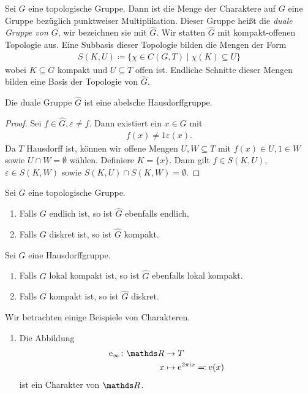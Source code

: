 \begin{defi}
Sei $G$ eine topologische Gruppe. Dann ist die Menge der Charaktere auf $G$ eine Gruppe bezüglich punktweiser Multiplikation.
Dieser Gruppe heißt die \emph{duale Gruppe von $G$}, wir bezeichnen sie mit $\hat{G}$.
Wir statten $\hat{G}$ mit kompakt-offenen Topologie aus.
Eine Subbasis dieser Topologie bilden die Mengen der Form
\begin{align*}
S(K,U)\coloneqq \{\chi \in C(G,T)\mid \chi(K)\subseteq U\}
\end{align*}
wobei $K\subseteq G$ kompakt und $U\subseteq T$ offen ist.
Endliche Schnitte dieser Mengen bilden eine Basis der Topologie von $\hat{G}$.
\end{defi}

\begin{prop}
Die duale Gruppe $\hat{G}$ ist eine abelsche Hausdorffgruppe.
\end{prop}
\begin{proof}
Sei $f \in \hat{G}, \varepsilon\not =f$.
Dann existiert ein $x\in G$ mit
\begin{align*}
f(x)\not =1 \varepsilon(x).
\end{align*}
Da $T$ Hausdorff ist, können wir offene Mengen $U,W \subseteq T$ mit $f(x)\in U, 1\in W$ sowie $U\cap W=\emptyset$ wählen.
Definiere $K=\{x\}$.
Dann gilt $f\in S(K,U)$, $\varepsilon\in S(K,W)$ sowie $S(K,U)\cap S(K,W)=\emptyset$.
\end{proof}

\begin{prop}
Sei $G$ eine topologische Gruppe.
\begin{enumerate}[label=\roman*)]
\item Falls $G$ endlich ist, so ist $\hat{G}$ ebenfalls endlich,
\item Falls $G$ diskret ist, so ist $\hat{G}$ kompakt.
\end{enumerate}
\end{prop}

\begin{prop}
Sei $G$ eine Hausdorffgruppe.
\begin{enumerate}[label=\roman*)]
\item Falls $G$ lokal kompakt ist, so ist $\hat{G}$ ebenfalls lokal kompakt.
\item Falls $G$ kompakt ist, so ist $\hat{G}$ diskret.
\end{enumerate}
\end{prop}

\begin{bsp}
Wir betrachten einige Beispiele von Charakteren.
\begin{enumerate}[label=\roman*)]
\item Die Abbildung
\begin{align*}
\mathrm{e}_\infty \colon \R &\to T\\
x &\mapsto \mathrm{e}^{2\pi \mathrm{i}x}\eqqcolon \mathrm{e}(x)
\end{align*}
ist ein Charakter von $\R$.
\end{enumerate}
\end{bsp}

